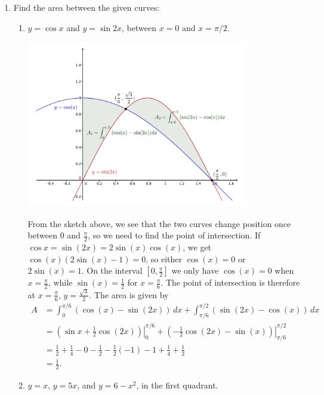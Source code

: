 \documentclass[12pt]{article}
\begin{document}
\begin{enumerate}
\item Find the area between the given curves:
\begin{enumerate}
\item $y=\cos x$ and $y=\sin 2x$, between $x=0$ and $x=\pi/2$.

\begin{center}
 \includegraphics[width=0.8\textwidth]{WS4-1d}
\end{center}

From the sketch above, we see that the two curves change position once between $0$ and $\frac{\pi}{2}$, so we need to find the point of intersection. If $\cos x = \sin(2x) = 2\sin(x)\cos(x)$, we get $\cos(x)(2\sin(x)-1)=0$, so either $\cos(x)=0$ or $2\sin(x)=1$. On the interval $[0,\frac{\pi}{2}]$ we only have $\cos(x)=0$ when $x=\frac{\pi}{2}$, while $\sin(x)=\frac{1}{2}$ for $x=\frac{\pi}{6}$. The point of intersection is therefore at $x=\frac{\pi}{6}$, $y=\frac{\sqrt{3}}{2}$. The area is given by
\begin{align*}
 A & = \int_0^{\pi/6}(\cos (x) -\sin (2x))\,dx + \int_{\pi/6}^{\pi/2}(\sin(2x)-\cos(x))\,dx\\
& = \left.(\sin x+\frac{1}{2}\cos(2x))\right|_0^{\pi/6} + \left.(-\frac{1}{2}\cos(2x)-\sin(x))\right|_{\pi/6}^{\pi/2}\\
& = \frac{1}{2}+\frac{1}{4}-0-\frac{1}{2}-\frac{1}{2}(-1)-1+\frac{1}{4}+\frac{1}{2}\\
& = \frac{1}{2}.
\end{align*}

  \item $y=x$, $y=5x$, and $y=6-x^2$, in the first quadrant. 
  

\end{enumerate}
\end{enumerate}
\end{document}
